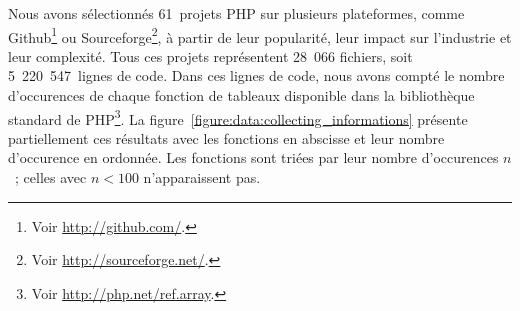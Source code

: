 Nous avons sélectionnés 61~projets PHP sur plusieurs plateformes, comme
Github\footnote{Voir \url{http://github.com/}.} ou Sourceforge\footnote{Voir
\url{http://sourceforge.net/}.}, à partir de leur popularité, leur impact sur
l'industrie et leur complexité. Tous ces projets représentent 28~066 fichiers,
soit 5~220~547~lignes de code. Dans ces lignes de code, nous avons compté le
nombre d'occurences de chaque fonction de tableaux disponible dans la
bibliothèque standard de PHP\footnote{Voir \url{http://php.net/ref.array}.}. La
figure~\ref{figure:data:collecting_informations} présente partiellement ces
résultats avec les fonctions en abscisse et leur nombre d'occurence en ordonnée.
Les fonctions sont triées par leur nombre d'occurences $n$~; celles avec $n <
100$ n'apparaissent pas.
%
\begin{figure}

{
\Huge

}
\end{figure}
